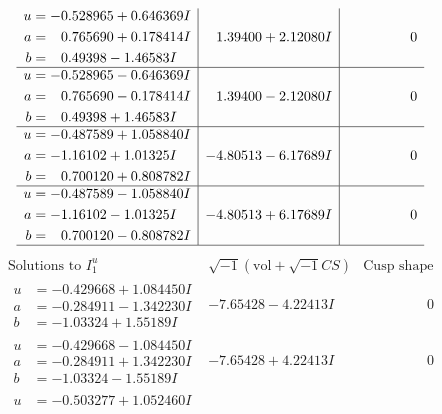 \documentclass[1p]{elsarticle_modified}
\theoremstyle{definition}
\newcommand{\I}{\sqrt{-1}}
\begin{document}
$$\begin{array}{c|c|c}
\begin{aligned}
u &= -0.528965 + 0.646369 I \\
a &= \phantom{-}0.765690 + 0.178414 I \\
b &= \phantom{-}0.49398 - 1.46583 I\end{aligned}
 & \phantom{-}1.39400 + 2.12080 I & \phantom{-0.000000 } 0 \\ \hline\begin{aligned}
u &= -0.528965 - 0.646369 I \\
a &= \phantom{-}0.765690 - 0.178414 I \\
b &= \phantom{-}0.49398 + 1.46583 I\end{aligned}
 & \phantom{-}1.39400 - 2.12080 I & \phantom{-0.000000 } 0 \\ \hline\begin{aligned}
u &= -0.487589 + 1.058840 I \\
a &= -1.16102 + 1.01325 I \\
b &= \phantom{-}0.700120 + 0.808782 I\end{aligned}
 & -4.80513 - 6.17689 I & \phantom{-0.000000 } 0 \\ \hline\begin{aligned}
u &= -0.487589 - 1.058840 I \\
a &= -1.16102 - 1.01325 I \\
b &= \phantom{-}0.700120 - 0.808782 I\end{aligned}
 & -4.80513 + 6.17689 I & \phantom{-0.000000 } 0\\
 \hline 
 \end{array}$$\newpage$$\begin{array}{c|c|c}  
\text{Solutions to }I^u_{1}& \I (\text{vol} + \sqrt{-1}CS) & \text{Cusp shape}\\
 \hline 
\begin{aligned}
u &= -0.429668 + 1.084450 I \\
a &= -0.284911 - 1.342230 I \\
b &= -1.03324 + 1.55189 I\end{aligned}
 & -7.65428 - 4.22413 I & \phantom{-0.000000 } 0 \\ \hline\begin{aligned}
u &= -0.429668 - 1.084450 I \\
a &= -0.284911 + 1.342230 I \\
b &= -1.03324 - 1.55189 I\end{aligned}
 & -7.65428 + 4.22413 I & \phantom{-0.000000 } 0 \\ \hline\begin{aligned}
u &= -0.503277 + 1.052460 I \\

\end{aligned}
\end{array}$$
\end{document}
